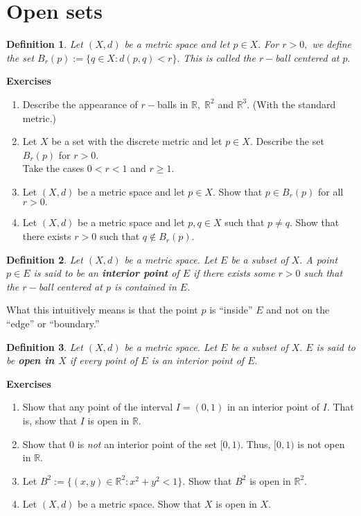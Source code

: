 \documentclass{article}
\newtheorem{defn}{Definition}
\begin{document}
	\section{Open sets}
	\begin{defn}
		Let $(X, d)$ be a metric space and let $p \in X.$ For $r > 0,$ we define the set $B_r(p) := \{q \in X : d(p, q) < r\}.$ This is called the $r-$ball centered at $p.$
	\end{defn}
	\textbf{Exercises}
	\begin{enumerate}[nosep] 
		\item Describe the appearance of $r-$balls in $\mathbb{R},\; \mathbb{R}^2$ and $\mathbb{R}^3.$ (With the standard metric.)
		\item Let $X$ be a set with the discrete metric and let $p \in X.$ Describe the set $B_r(p)$ for $r > 0.$\\
		Take the cases $0 < r < 1$ and $r \ge 1.$
		\item Let $(X, d)$ be a metric space and let $p \in X.$ Show that $p \in B_r(p)$ for all $r > 0.$
		\item Let $(X, d)$ be a metric space and let $p, q \in X$ such that $p \neq q.$ Show that there exists $r > 0$ such that $q \not \in B_r(p).$
	\end{enumerate}
	\begin{defn}
		Let $(X, d)$ be a metric space. Let $E$ be a subset of $X.$ A point $p \in E$ is said to be an \textbf{interior point} of $E$ if there exists some $r > 0$ such that the $r-$ball centered at $p$ is contained in $E.$
	\end{defn}
	What this intuitively means is that the point $p$ is ``inside'' $E$ and not on the ``edge'' or ``boundary.''
	\begin{defn}
		Let $(X, d)$ be a metric space. Let $E$ be a subset of $X.$ $E$ is said to be \textbf{open in $X$} if every point of $E$ is an interior point of $E.$
	\end{defn}
	\textbf{Exercises}
	\begin{enumerate}[nosep] 
		\item Show that any point of the interval $I = (0, 1)$ in an interior point of $I.$ That is, show that $I$ is open in $\mathbb{R}.$
		\item Show that $0$ is \emph{not} an interior point of the set $[0, 1).$ Thus, $[0, 1)$ is not open in $\mathbb{R}.$
		\item Let $B^2 := \{(x, y) \in \mathbb{R}^2 : x^2 + y^2 < 1\}.$ Show that $B^2$ is open in $\mathbb{R}^2.$
		\item Let $(X, d)$ be a metric space. Show that $X$ is open in $X.$
	\end{enumerate}
\end{document}

